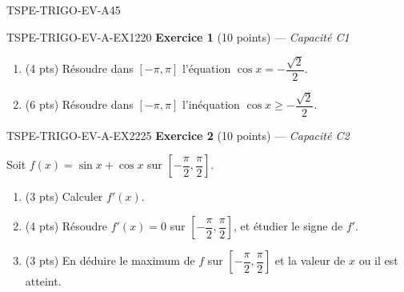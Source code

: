 

\begin{evaluation}{TSPE-TRIGO-EV-A}{45}

\begin{exercice}{TSPE-TRIGO-EV-A-EX1}{2}{20}
\textbf{Exercice 1} (10 points) — \textit{Capacité C1}

\medskip

\begin{enumerate}
  \item (4 pts) Résoudre dans $[-\pi,\pi]$ l'équation $\cos x = -\dfrac{\sqrt{2}}{2}$.
  \item (6 pts) Résoudre dans $[-\pi,\pi]$ l'inéquation $\cos x \geq -\dfrac{\sqrt{2}}{2}$.
\end{enumerate}
\end{exercice}

\begin{exercice}{TSPE-TRIGO-EV-A-EX2}{2}{25}
\textbf{Exercice 2} (10 points) — \textit{Capacité C2}

\medskip

Soit $f(x) = \sin x + \cos x$ sur $\left[-\dfrac{\pi}{2}, \dfrac{\pi}{2}\right]$.
\begin{enumerate}
  \item (3 pts) Calculer $f'(x)$.
  \item (4 pts) Résoudre $f'(x)=0$ sur $\left[-\dfrac{\pi}{2},\dfrac{\pi}{2}\right]$, et étudier le signe de $f'$.
  \item (3 pts) En déduire le maximum de $f$ sur $\left[-\dfrac{\pi}{2},\dfrac{\pi}{2}\right]$ et la valeur de $x$ ou il est atteint.
\end{enumerate}
\end{exercice}

\end{evaluation}
